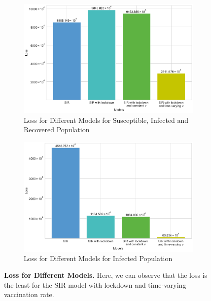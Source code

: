\documentclass[tikz,fleqn,12pt]{wlscirep}
\begin{document}
\begin{figure}[htbp!]
	\begin{subfigure}[t]{0.48\textwidth}
		\centering
		\includegraphics[width=\linewidth]{images/comparing_costs_SIR_IND.pdf}
		\caption{Loss for Different Models for Susceptible, Infected and Recovered Population}
		\label{fig:comparing_costs_SIR_IND}
	\end{subfigure}
	\hfill
	\begin{subfigure}[t]{0.48\textwidth}
		\centering
		\includegraphics[width=\linewidth]{images/comparing_costs_I_IND.pdf}
		\caption{Loss for Different Models for Infected Population}
		\label{fig:comparing_costs_I_IND}
	\end{subfigure}
  \caption{\textbf{Loss for Different Models.} Here, we can observe that the loss is the least for the SIR model with lockdown and time-varying vaccination rate.}
  \label{fig:comparing_costs_IND_parent}
\end{figure}
\end{document}
